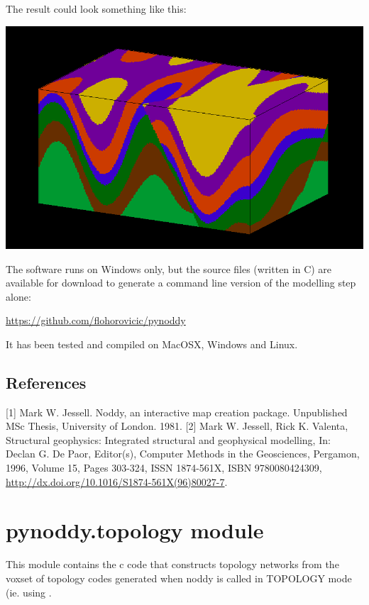 \documentclass[a4paper,10pt,english]{sphinxmanual}
\begin{document}
The result could look something like this:

\includegraphics{noddy_block_example.png}

The software runs on Windows only, but the source files (written in C)
are available for download to generate a command line version of the
modelling step alone:

\href{https://github.com/flohorovicic/pynoddy}{https://github.com/flohorovicic/pynoddy}

It has been tested and compiled on MacOSX, Windows and Linux.


\section{References}
\label{readme:references}
{[}1{]} Mark W. Jessell. Noddy, an interactive map creation package.
Unpublished MSc Thesis, University of London. 1981. {[}2{]} Mark W. Jessell,
Rick K. Valenta, Structural geophysics: Integrated structural and
geophysical modelling, In: Declan G. De Paor, Editor(s), Computer
Methods in the Geosciences, Pergamon, 1996, Volume 15, Pages 303-324,
ISSN 1874-561X, ISBN 9780080424309,
\href{http://dx.doi.org/10.1016/S1874-561X(96)80027-7}{http://dx.doi.org/10.1016/S1874-561X(96)80027-7}.


\chapter{pynoddy.topology module}
\label{topology:pynoddy-topology-module}\label{topology::doc}
This module contains the c code that constructs topology networks from the voxset of
topology codes generated when noddy is called in TOPOLOGY mode (ie. using
.
\end{document}
